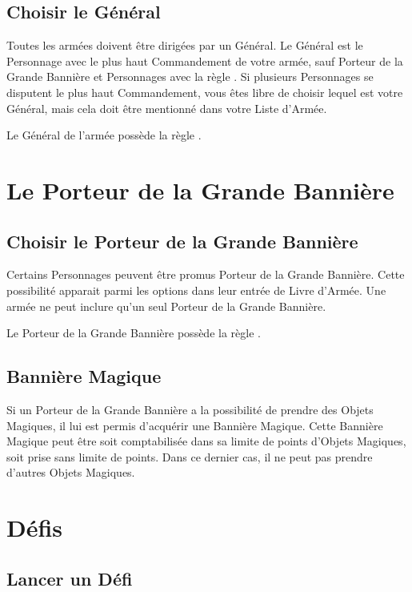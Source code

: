 \subsection{Choisir le Général}
\label{choosing_the_general}

Toutes les armées doivent être dirigées par un Général. Le Général est le Personnage avec le plus haut Commandement de votre armée, sauf Porteur de la Grande Bannière et Personnages avec la règle \notaleader{}. Si plusieurs Personnages se disputent le plus haut Commandement, vous êtes libre de choisir lequel est votre Général, mais cela doit être mentionné dans votre Liste d'Armée.

Le Général de l'armée possède la règle \textbf{\inspiringpresence}.


\hypertarget{thebsb}{\section{Le Porteur de la Grande Bannière}}
\label{thebsb}

\subsection{Choisir le Porteur de la Grande Bannière}

Certains Personnages peuvent être promus Porteur de la Grande Bannière. Cette possibilité apparait parmi les options dans leur entrée de Livre d'Armée. Une armée ne peut inclure qu'un seul Porteur de la Grande Bannière.

Le Porteur de la Grande Bannière possède la règle \textbf{\holdyourground}.

\subsection{Bannière Magique}

Si un Porteur de la Grande Bannière a la possibilité de prendre des Objets Magiques, il lui est permis d'acquérir une Bannière Magique. Cette Bannière Magique peut être soit comptabilisée dans sa limite de points d’Objets Magiques, soit prise sans limite de points. Dans ce dernier cas, il ne peut pas prendre d'autres Objets Magiques.


\newpage
\hypertarget{challenges}{\section{Défis}}

\subsection{Lancer un Défi}

